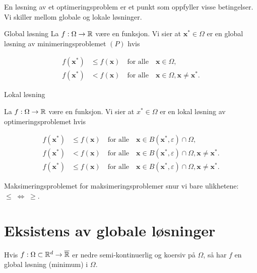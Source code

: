 En løsning av et optimeringsproblem er et punkt som oppfyller visse betingelser.
Vi skiller mellom globale og lokale løsninger.

\begin{definition}{Global løsning}{}
  La \(f: \Omega \to \mathbb{R}\) være en funksjon. Vi sier at \(\symbf{x}^* \in \Omega\) er en global løsning av minimeringsproblemet \((P)\) hvis

  \begin{align*}
    f(\symbf{x}^*) & \leq f(\symbf{x}) \quad \text{for alle} \quad \symbf{x} \in \Omega, \tag{Global}                                  \\
    f(\symbf{x}^*) & < f(\symbf{x}) \quad \text{for alle} \quad \symbf{x} \in \Omega, \symbf{x} \neq \symbf{x}^*. \tag{Strengt Global}
  \end{align*}
\end{definition}

\begin{definition}{Lokal løsning}{}

  La \(f: \Omega \to \mathbb{R}\) være en funksjon. Vi sier at \(x^* \in \Omega\) er en lokal løsning av optimeringsproblemet hvis

  \begin{align*}
    f(\symbf{x}^*) & \leq f(\symbf{x}) \quad \text{for alle} \quad \symbf{x} \in B(\symbf{x}^*, \varepsilon) \cap \Omega, \tag{Lokal}                                     \\
    f(\symbf{x}^*) & < f(\symbf{x}) \quad \text{for alle} \quad \symbf{x} \in B(\symbf{x}^*, \varepsilon) \cap \Omega, \symbf{x} \neq \symbf{x}^*. \tag{Strengt Lokal}    \\
    f(\symbf{x}^*) & \leq f(\symbf{x}) \quad \text{for alle} \quad \symbf{x} \in B(\symbf{x}^*, \varepsilon) \cap \Omega, \symbf{x} \neq \symbf{x}^*. \tag{Isolert Lokal}
  \end{align*}
\end{definition}

\begin{remark}{Maksimeringsproblemet}{}
  for maksimeringsproblemer snur vi bare ulikhetene: \(\leq \; \Leftrightarrow \; \geq\).
\end{remark}

\section*{Eksistens av globale løsninger}

Hvis \(f: \Omega \subset \mathbb{R}^d \to \overline{\mathbb{R}}\) er nedre semi-kontinuerlig og koersiv på \(\Omega\), så har \(f\) en global løsning (minimum) i \(\Omega\).

